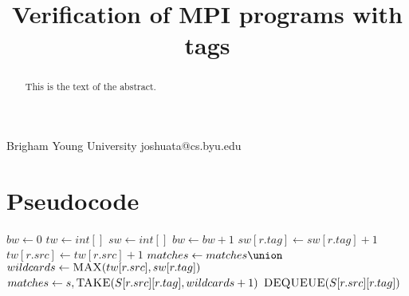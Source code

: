 \documentclass[preprint]{sigplanconf}
\begin{document}
\setlength{\pdfpageheight}{\paperheight}
\setlength{\pdfpagewidth}{\paperwidth}




\title{Verification of MPI programs with tags}

           {Brigham Young University}
           {joshuata@cs.byu.edu}

\maketitle

\begin{abstract}
This is the text of the abstract.
\end{abstract}





\section{Pseudocode}

\begin{algorithmic}
	\State $bw \gets 0$
	\State $tw \gets int[]$
	\State $sw \gets int[]$
			\State $ bw \gets bw+1 $
			\State $ sw[r.tag] \gets sw[r.tag]+1 $
			\State $ tw[r.src] \gets tw[r.src]+1 $
				\State $ matches \gets matches \union $
			\EndFor
		\Else
			\State $ wildcards \gets \Call{MAX}{tw[r.src], sw[r.tag]} $
			\State $ matches \gets s, \Call{TAKE}{S[r.src][r.tag], wildcards + 1}$
			\State $ \Call{DEQUEUE}{S[r.src][r.tag]} $
		\EndIf
	\EndFor
\EndFunction
\end{algorithmic}
\end{document}
